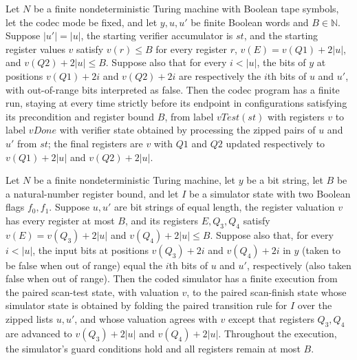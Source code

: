 \begin{theorem}
\label{Complexity.Codec.v_run}
\leanok
{}
Let $N$ be a finite nondeterministic Turing machine with Boolean tape symbols, let the
codec mode be fixed, and let $y,u,u'$ be finite Boolean words and $B\in\mathbb N$.
Suppose $|u'|=|u|$, the starting verifier accumulator is $st$, and the starting register
values $v$ satisfy $v(r)\le B$ for every register $r$, $v(E)=v(Q1)+2|u|$, and
$v(Q2)+2|u|\le B$. Suppose also that for every $i<|u|$, the bits of $y$ at positions
$v(Q1)+2i$ and $v(Q2)+2i$ are respectively the $i$th bits of $u$ and $u'$, with
out-of-range bits interpreted as false. Then the codec program has a finite run, staying
at every time strictly before its endpoint in configurations satisfying its precondition
and register bound $B$, from label $vTest(st)$ with registers $v$ to label $vDone$ with
verifier state obtained by processing the zipped pairs of $u$ and $u'$ from $st$; the
final registers are $v$ with $Q1$ and $Q2$ updated respectively to $v(Q1)+2|u|$ and
$v(Q2)+2|u|$.
\end{theorem}

\begin{theorem}
\label{Complexity.Codec.s_run}
\leanok
{}
Let $N$ be a finite nondeterministic Turing machine, let $y$ be a bit string, let $B$ be
a natural-number register bound, and let $I$ be a simulator state with two Boolean flags
$f_0,f_1$. Suppose $u,u'$ are bit strings of equal length, the register valuation $v$
has every register at most $B$, and its registers $E,Q_3,Q_4$ satisfy $v(E)=v(Q_3)+2|u|$
and $v(Q_4)+2|u|\le B$. Suppose also that, for every $i<|u|$, the input bits at
positions $v(Q_3)+2i$ and $v(Q_4)+2i$ in $y$ (taken to be false when out of range) equal
the $i$th bits of $u$ and $u'$, respectively (also taken false when out of range). Then
the coded simulator has a finite execution from the paired scan-test state, with
valuation $v$, to the paired scan-finish state whose simulator state is obtained by
folding the paired transition rule for $I$ over the zipped lists $u,u'$, and whose
valuation agrees with $v$ except that registers $Q_3,Q_4$ are advanced to $v(Q_3)+2|u|$
and $v(Q_4)+2|u|$. Throughout the execution, the simulator's guard conditions hold and
all registers remain at most $B$.
\end{theorem}

